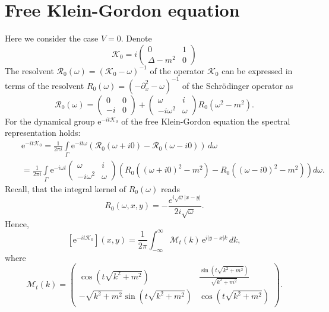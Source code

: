\documentclass[reqno]{amsart}
\newcommand{\cR}{{\mathcal R}}
\newcommand{\cK}{{\mathcal K}}
\newcommand{\om}{\omega}
\newcommand{\ds}{\displaystyle}
\newcommand{\E}{\mathrm{e}}
\numberwithin{equation}{section}
\begin{document}
\section{Free Klein-Gordon equation}\label{KG0}
Here we consider the case $V= 0$. Denote
$$
 \cK_0 = i\begin{pmatrix}
  0                          &   1\\
 \Delta-m^2  &   0
\end{pmatrix}
$$
The resolvent $\cR_0(\omega)=(\cK_0-\omega)^{-1}$ of the operator   $\cK_0$  can be expressed in terms of the resolvent  
$R_0(\omega)=(-\partial^2_x-\omega)^{-1}$ of the Schr\"odinger operator as
\[
 \cR_0(\omega)=
   \begin{pmatrix}
 0            &  0\\
  -i          &  0
\end{pmatrix}
+
\begin{pmatrix}
 \omega &  i \\
  -i\omega^2&  \omega
\end{pmatrix} R_0(\omega^2-m^2).
\]
For the dynamical group $\E^{-it\cK_0}$ of the free Klein-Gordon equation the spectral representation  holds:
\begin{eqnarray}\nonumber
\!\!\!\!\!\!\!\!\!\!\!\!&&\!\!\!\!\!\!\!\!\!\!\!\!\!\!\!\!\E^{-it\cK_0}
   =\frac 1{2\pi i}\int\limits_\Gamma  \E^{-it\omega} ( \cR_0(\omega+i0)-\cR_0(\omega-i0))\,d\omega\\
\label{Rep0}
\!\!\!\!\!\!\!\!\!\!&&\!\!\!\!\!\!\!\!\!\!\!\!\!\!=\frac 1{2\pi i}\int\limits_\Gamma \E^{-i\om t}
\begin{pmatrix}
 \omega &  i \\\label{PP1}
  -i\omega^2&  \omega
\end{pmatrix}\left(R_0((\omega+i0)^2\!-\!m^2)-\!R_0((\omega-i0)^2\!-\!m^2)\right)d\om.
\end{eqnarray}
Recall, that the integral kernel of   $R_0(\omega)$ reads
$$
R_0(\omega,x,y)=-\frac{e^{i\sqrt\omega|x-y|}}{2i\sqrt\omega}.
$$
Hence,
\begin{equation}\label{K0-rep}
[\E^{-it\cK_0}](x,y)=\frac{1}{2\pi}\int_{-\infty}^{\infty}{\mathcal M}_t(k)\,\E^{i|y-x|k}\,dk,
\end{equation}
where
\begin{equation}\label{M}
{\mathcal M}_t(k)=\begin{pmatrix}
 \cos(t\sqrt{k^2 + m^2})  & \ds\frac{\sin(t\sqrt{k^2 + m^2})}{\sqrt{k^2+m^2}}\\
  -\sqrt{k^2+m^2}\sin(t\sqrt{k^2 + m^2})&  \cos(t\sqrt{k^2 + m^2})
\end{pmatrix}.
\end{equation}
\end{document}
